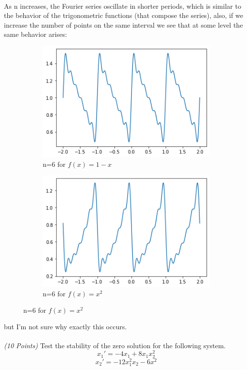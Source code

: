 \documentclass{article}
\begin{document}
\paragraph{} As n increases, the Fourier series oscillate in shorter periods, which is similar to the behavior of the trigonometric functions (that compose the series), also, if we increase the number of points on the same interval we see that at some level the same behavior arises:
\begin{center}
\begin{figure}[h!]
	\centering
	\begin{subfigure}[b]{0.2\linewidth}
		\includegraphics[width=\linewidth]{img/f1_n6_more.png}
		\caption{n=6 for $f(x) = 1-x$}
	\end{subfigure}
	\begin{subfigure}[b]{0.2\linewidth}
		\includegraphics[width=\linewidth]{img/f2_n6_more.png}
		\caption{n=6 for $f(x) = x^2$}
	\end{subfigure}
\end{figure}
\end{center}
but I'm not sure why exactly this occurs.
\paragraph{}\textit{(10 Points)} Test the stability of the zero solution for the following system.
$$x_1' = -4x_1 + 8x_1x^2_2$$
$$x_2' = -12x^2_1x_2 - 6x^2$$
\end{document}
